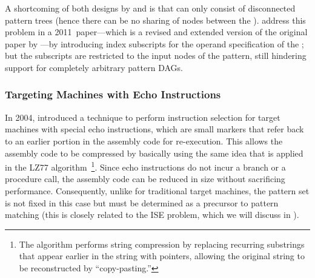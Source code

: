 A shortcoming of both designs by \citeauthor{Scharwaechter2007} and
\citeauthor{Ahn2009} is that \tcomplexRules can only consist of disconnected
\glspl{pattern tree} (hence there can be no sharing of \glspl{node} between the
\tsplitPatterns).
%
\textcite{Youn2011} address this problem in a
2011~paper---which is a revised and extended version of the original paper by
\citeauthor{Scharwaechter2007}\unskip%
%
---by introducing index subscripts for the operand specification of the
\tcomplexRules; but the subscripts are restricted to the input \glspl{node} of
the \gls{pattern}, still hindering support for completely arbitrary
\glspl{pattern DAG}.


\subsubsection{Targeting Machines with Echo Instructions}

In 2004, \textcite{Brisk2004} introduced a technique to perform \gls{instruction
  selection} for \glspl{target machine} with special \glspl{echo instruction},
which are small markers that refer back to an earlier portion in the
\gls{assembly code} for re-execution.
%
This allows the \gls{assembly code} to be
compressed by basically using the same idea that is applied in the LZ77
algorithm~\cite{Ziv1977}\footnote{The algorithm performs string compression by
  replacing recurring substrings that appear earlier in the string with
  pointers, allowing the original string to be reconstructed by
  ``copy-pasting.''}.
%
Since \glspl{echo instruction} do not incur a branch or a
procedure call, the \gls{assembly code} can be reduced in size without
sacrificing performance.
%
Consequently, unlike for traditional \glspl{target
  machine}, the \gls{pattern set} is not fixed in this case but must be
determined as a precursor to \gls{pattern matching} (this is closely related to
the \gls{ISE problem}, which we will discuss in ).

